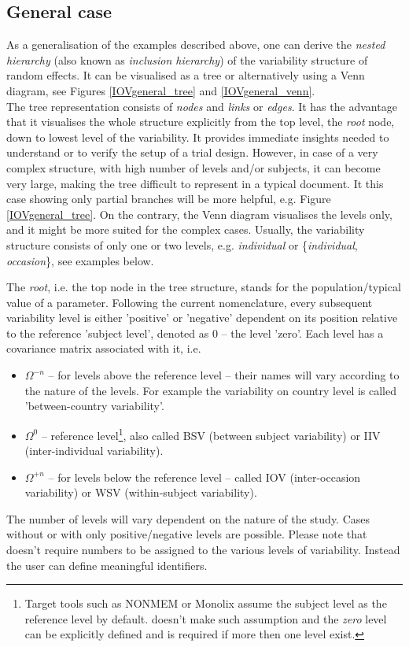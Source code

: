 \subsection{General case}
As a generalisation of the examples described above, one can derive the 
\textit{nested hierarchy} (also known as \textit{inclusion hierarchy}) of the variability 
structure of random effects. It can be visualised as a tree or alternatively using 
a Venn diagram, see Figures \ref{IOVgeneral_tree} and \ref{IOVgeneral_venn}. \\
The tree representation consists of \textit{nodes} and \textit{links} or \textit{edges}. 
It has the advantage that it visualises the whole structure explicitly from the top 
level, the \textit{root} node, down to lowest level of the variability. It provides 
immediate insights needed to understand or to verify the setup of a trial design. 
However, in case of a very complex structure, with high number of levels and/or 
subjects, it can become very large, making the tree difficult to represent in a typical 
document. It this case showing only partial branches will be more helpful, 
e.g. Figure \ref{IOVgeneral_tree}. 
On the contrary, the Venn diagram visualises 
the levels only, and it might be more suited for the complex cases. 
Usually, the variability structure consists of only one or two levels, e.g. \textit{individual} or 
\{\textit{individual}, \textit{occasion}\}, see examples below. 


The \textit{root}, i.e. the top node in the tree structure, stands for the population/typical 
value of a parameter. Following the current nomenclature, every subsequent variability 
level is either 'positive' or 'negative' dependent on its position relative to the reference 
'subject level', denoted as 0 -- the level 'zero'. Each level has a covariance matrix 
associated with it, i.e. 
\begin{itemize}
\item 
$\Omega^{-n}$ -- for levels above the reference level -- their names will vary according to 
the nature of the levels. For example the variability on country level is called 
'between-country variability'.
\item 
$\Omega^0$ -- reference level\footnote{Target tools such as NONMEM or Monolix assume 
the subject level as the reference level by default. \pml doesn't make such assumption and 
the \emph{zero} level can be explicitly defined and is required if more then one level exist.}, 
also called BSV (between subject variability) or IIV (inter-individual variability).
\item 
$\Omega^{+n}$ -- for levels below the reference level -- called  IOV (inter-occasion variability) or
WSV (within-subject variability).
\end{itemize}
The number of levels will vary dependent on the nature of the study. Cases without or 
with only positive/negative levels are possible. Please note that \pharmml doesn't require 
numbers to be assigned to the various levels of variability. Instead the user can 
define meaningful identifiers.

